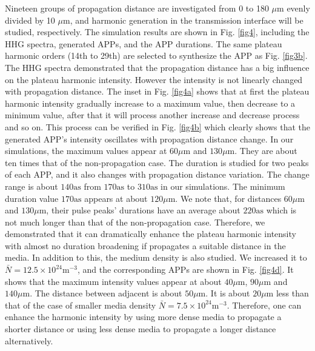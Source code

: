 \documentclass[10pt,letterpaper]{article}
\begin{document}
Nineteen groups of propagation distance are investigated from 0 to 180 $ \mu $m evenly divided by 10 $ \mu $m, and harmonic generation in the transmission interface will be studied, respectively. The simulation results are shown in Fig. \ref{fig4}, including the HHG spectra, generated APPs, and the APP durations. The same plateau harmonic orders (14th to 29th) are selected to synthesize the APP as Fig. \ref{fig3b}. The HHG spectra demonstrated that the propagation distance has a big influence on the plateau harmonic intensity. However the intensity is not linearly changed with propagation distance. The inset in Fig. \ref{fig4a} shows that at first the plateau harmonic intensity gradually increase to a maximum value, then decrease to a minimum value, after that it will process another increase and decrease process and so on. This process can be verified in Fig. \ref{fig4b} which clearly shows that the generated APP's intensity oscillates with propagation distance change. In our simulations, the maximum values appear at $60\mu\textrm{m}$ and $130\mu\textrm{m}$. They are about ten times that of the non-propagation case. The duration is studied for two peaks of each APP, and it also changes with propagation distance variation. The change range is about $140\textrm{as}$ from $170\textrm{as}$ to $310\textrm{as}$ in our simulations. The minimum duration value $170\textrm{as}$ appears at about $120\mu\textrm{m}$. We note that, for distances $60\mu\textrm{m}$ and $130\mu\textrm{m}$, their pulse peaks’ durations have an average about $220\textrm{as}$ which is not much longer than that of the non-propagation case. Therefore, we demonstrated that it can dramatically enhance the plateau harmonic intensity with almost no duration broadening if propagates a suitable distance in the media. In addition to this, the medium density is also studied. We increased it to $\bar{N}=12.5\times10^{24}\textrm{m}^{-3}$, and the corresponding APPs are shown in Fig. \ref{fig4d}. It shows that the maximum intensity values appear at about $40\mu\textrm{m}$, $90\mu\textrm{m}$ and $140\mu\textrm{m}$. The distance between adjacent is about $50\mu\textrm{m}$. It is about $20\mu\textrm{m}$ less than that of the case of smaller media density $\bar{N}=7.5\times10^{24}\textrm{m}^{-3}$. Therefore, one can enhance the harmonic intensity by using more dense media to propagate a shorter distance or using less dense media to propagate a longer distance alternatively.
\end{document}
